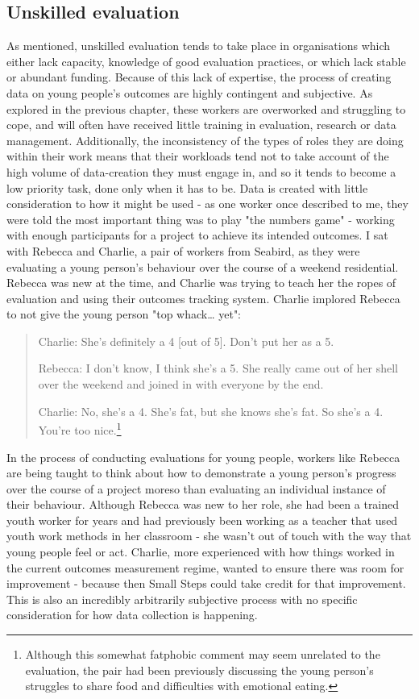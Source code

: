 \subsection{Unskilled evaluation}
\label{subsec:6-4-1-unskilled-eval}
As mentioned, unskilled evaluation tends to take place in organisations which either lack capacity, knowledge of good evaluation practices, or which lack stable or abundant funding. Because of this lack of expertise, the process of creating data on young people's outcomes are highly contingent and subjective. As explored in the previous chapter, these workers are overworked and struggling to cope, and will often have received little training in evaluation, research or data management. Additionally, the inconsistency of the types of roles they are doing within their work means that their workloads tend not to take account of the high volume of data-creation they must engage in, and so it tends to become a low priority task, done only when it has to be. Data is created with little consideration to how it might be used - as one worker once described to me, they were told the most important thing was to play "the numbers game" - working with enough participants for a project to achieve its intended outcomes. I sat with Rebecca and Charlie, a pair of workers from Seabird, as they were evaluating a young person’s behaviour over the course of a weekend residential. Rebecca was new at the time, and Charlie was trying to teach her the ropes of evaluation and using their outcomes tracking system. Charlie implored Rebecca to not give the young person "top whack… yet":
\begin{quote}
Charlie: She’s definitely a 4 [out of 5]. Don’t put her as a 5.

Rebecca: I don’t know, I think she’s a 5. She really came out of her shell over the weekend and joined in with everyone by the end.

Charlie: No, she’s a 4. She’s fat, but she knows she’s fat. So she’s a 4. You’re too nice.\footnote{Although  this somewhat fatphobic comment may seem unrelated to the evaluation, the pair had been previously discussing the young person's struggles to share food and difficulties with emotional eating.}
\end{quote}
In the process of conducting evaluations for young people, workers like Rebecca are being taught to think about how to demonstrate a young person’s progress over the course of a project moreso than evaluating an individual instance of their behaviour. Although Rebecca was new to her role, she had been a trained youth worker for years and had previously been working as a teacher that used youth work methods in her classroom - she wasn't out of touch with the way that young people feel or act. Charlie, more experienced with how things worked in the current outcomes measurement regime, wanted to ensure there was room for improvement - because then Small Steps could take credit for that improvement. This is also an incredibly arbitrarily subjective process with no specific consideration for how data collection is happening.

